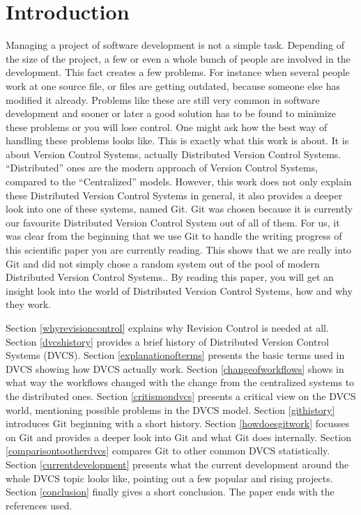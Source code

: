 \section {Introduction}

Managing a project of software development is not a simple task. Depending of the size of the project, a few or even a whole bunch of people are involved in the development. This fact creates a few problems. For instance when several people work at one source file, or files are getting outdated, because someone else has modified it already. Problems like these are still very common in software development and sooner or later a good solution has to be found to minimize these problems or you will lose control. One might ask how the best way of handling these problems looks like.
This is exactly what this work is about. It is about Version Control Systems, actually Distributed Version Control Systems. "`Distributed"' ones are the modern approach of Version Control Systems, compared to the "`Centralized"' models. However, this work does not only explain these Distributed Version Control Systems in general, it also provides a deeper look into one of these systems, named Git.
Git was chosen because it is currently our favourite Distributed Version Control System out of all of them. For us, it was clear from the beginning that we use Git to handle the writing progress of this scientific paper you are currently reading. This shows that we are really into Git and did not simply chose a random system out of the pool of modern Distributed Version Control Systems..
By reading this paper, you will get an insight look into the world of Distributed Version Control Systems, how and why they work.

Section \ref{whyrevisioncontrol} explains why Revision Control is needed at all. Section \ref{dvcshistory} provides a brief history of Distributed Version Control Systems (DVCS). Section \ref{explanationofterms} presents the basic terms used in DVCS showing how DVCS actually work. Section \ref{changeofworkflows} shows in what way the workflows changed with the change from the centralized systems to the distributed ones. Section \ref{critismondvcs} presents a critical view on the DVCS world, mentioning possible problems in the DVCS model. Section \ref{githistory} introduces Git beginning with a short history. Section \ref{howdoesgitwork} focusses on Git and provides a deeper look into Git and what Git does internally. Section \ref{comparisontootherdvcs} compares Git to other common DVCS statistically. Section \ref{currentdevelopment} presents what the current development around the whole DVCS topic looks like, pointing out a few popular and rising projects. Section \ref{conclusion} finally gives a short conclusion. The paper ends with the references used. 

